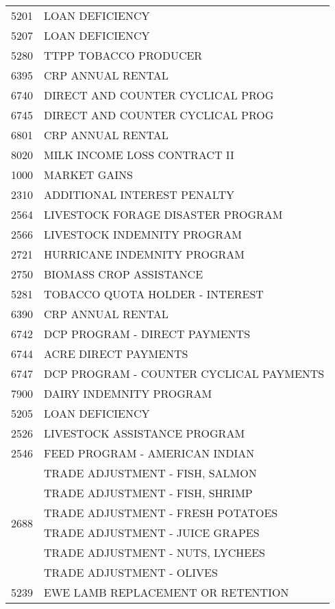\begin{longtable}{ll}
5201 & LOAN DEFICIENCY \\
\cline{1-2}
5207 & LOAN DEFICIENCY \\
\cline{1-2}
5280 & TTPP TOBACCO PRODUCER \\
\cline{1-2}
6395 & CRP ANNUAL RENTAL \\
\cline{1-2}
6740 & DIRECT AND COUNTER CYCLICAL PROG \\
\cline{1-2}
6745 & DIRECT AND COUNTER CYCLICAL PROG \\
\cline{1-2}
6801 & CRP ANNUAL RENTAL \\
\cline{1-2}
8020 & MILK INCOME LOSS CONTRACT II \\
\cline{1-2}
1000 & MARKET GAINS \\
\cline{1-2}
2310 & ADDITIONAL INTEREST PENALTY \\
\cline{1-2}
2564 & LIVESTOCK FORAGE DISASTER  PROGRAM \\
\cline{1-2}
2566 & LIVESTOCK INDEMNITY PROGRAM \\
\cline{1-2}
2721 & HURRICANE INDEMNITY PROGRAM \\
\cline{1-2}
2750 & BIOMASS CROP ASSISTANCE \\
\cline{1-2}
5281 & TOBACCO QUOTA HOLDER - INTEREST \\
\cline{1-2}
6390 & CRP ANNUAL RENTAL \\
\cline{1-2}
6742 & DCP PROGRAM - DIRECT PAYMENTS \\
\cline{1-2}
6744 & ACRE DIRECT PAYMENTS \\
\cline{1-2}
6747 & DCP PROGRAM - COUNTER CYCLICAL PAYMENTS \\
\cline{1-2}
7900 & DAIRY INDEMNITY PROGRAM \\
\cline{1-2}
5205 & LOAN DEFICIENCY \\
\cline{1-2}
2526 & LIVESTOCK ASSISTANCE PROGRAM \\
\cline{1-2}
2546 & FEED PROGRAM - AMERICAN INDIAN \\
\cline{1-2}
\multirow[t]{6}{*}{2688} & TRADE ADJUSTMENT - FISH, SALMON \\
 & TRADE ADJUSTMENT - FISH, SHRIMP \\
 & TRADE ADJUSTMENT - FRESH POTATOES \\
 & TRADE ADJUSTMENT - JUICE GRAPES \\
 & TRADE ADJUSTMENT - NUTS, LYCHEES \\
 & TRADE ADJUSTMENT - OLIVES \\
\cline{1-2}
5239 & EWE LAMB REPLACEMENT OR RETENTION \\
\cline{1-2}

\end{longtable}
